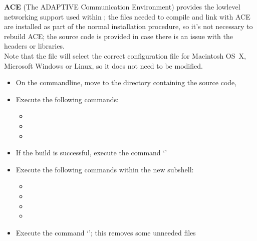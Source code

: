 \secondaryEnd
{}
\textbf{ACE} (The ADAPTIVE Communication Environment) provides the low\longDash{}level
networking support used within \mplusm{}; the files needed to compile and link with ACE
are installed as part of the normal \mplusm{} installation procedure, so it's not
necessary to rebuild ACE; the source code is provided in case there is an issue with the
headers or libraries.\\

Note that the file  will select the correct
configuration file for Macintosh OS~X, Microsoft Windows or Linux, so it does not need to
be modified.
\begin{itemize}
\item On the command\longDash{}line, move to the directory containing the \mplusm{} source
code, 
\item\exSp{} Execute the following commands:
\begin{itemize}
\item{}
\item\exSp{}
\item\exSp{}
\end{itemize}
\item\exSp{} If the build is successful, execute the command `'
\item\exSp{} Execute the following commands within the new subshell:
\begin{itemize}
\item{}
\item\exSp{}
\item\exSp{}
\item\exSp{}
\end{itemize}
\item\exSp{} Execute the command `'; this removes some
unneeded files
\end{itemize}
\tertiaryEnd
{}
